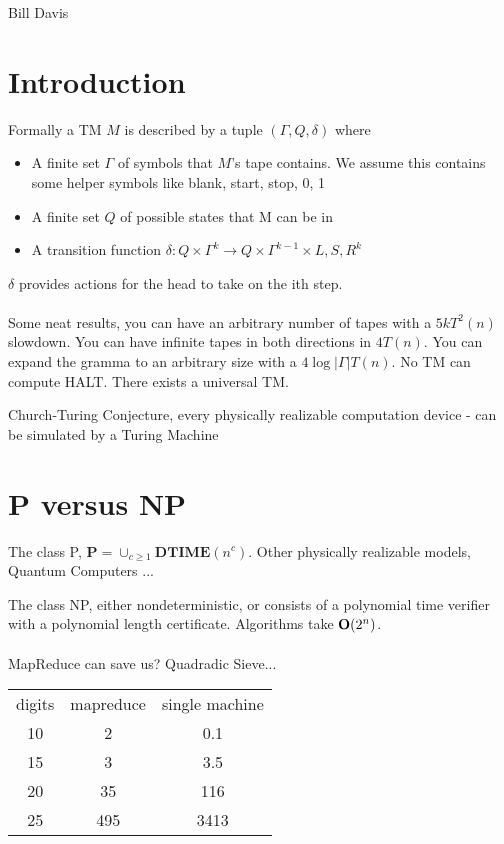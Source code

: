 \documentclass[11pt,fleqn]{article}
\begin{document}
\newcommand{\mbf}[1]{\mbox{{\bfseries #1}}}
\newcommand{\N}{\mbf{N}}
\renewcommand{\O}{\mbf{O}}

\noindent Bill Davis \\

\section{Introduction}

Formally a TM $M$ is described by a tuple $(\Gamma, Q, \delta)$ where
\begin{itemize}
  \item A finite set $\Gamma$ of symbols that $M$'s tape contains. We assume this contains some helper symbols like blank, start, stop, 0, 1
  \item A finite set $Q$ of possible states that M can be in
  \item A transition function $\delta:Q \times \Gamma^k \rightarrow Q \times  \Gamma^{k-1} \times {L,S,R}^k$
\end{itemize}
$\delta$ provides actions for the head to take on the ith step. 
\\
\\
Some neat results, you can have an arbitrary number of tapes with a $5kT^2(n)$ slowdown. You can have infinite tapes in both directions in $4T(n)$. You can expand the gramma to an arbitrary size with a $4 \log{|\Gamma|} T(n)$. No TM can compute HALT. There exists a universal TM. 

Church-Turing Conjecture, every physically realizable computation device - can be simulated by a Turing Machine


\section{P versus NP}
The class P, $\textbf{P} = \cup_{c \ge 1}\textbf{DTIME}(n^c)$. Other physically realizable models, Quantum Computers ...

The class NP, either nondeterministic, or consists of a polynomial time verifier with a polynomial length certificate. Algorithms take $\O(2^n)$.
\\
\\
MapReduce can save us? Quadradic Sieve...


\begin{tabular}{c c c}
\hline 
digits & mapreduce & single machine \\
10 & 2 & 0.1 \\
15 & 3 & 3.5 \\
20 & 35 & 116 \\ 
25 & 495 & 3413 \\
\end{tabular}
\end{document}
